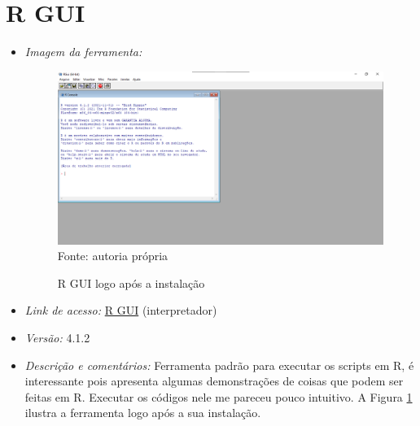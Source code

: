   \section{R GUI}
      \begin{itemize}
      	
      	\item \textit{Imagem da ferramenta:}
      	
      	\begin{figure}[H]  \label{RGUI}
      		\centering
      		\caption{R GUI logo após a instalação}
      		\includegraphics[width=16cm]{PicturesJoaoDias/Ferramentas/RGUI/R_GUI_tela_inicial.png}
      		{\tiny \sf Fonte: autoria própria}
      	\end{figure}
      	
          \item \textit{Link de acesso:} \href{https://cran.rstudio.com/bin/windows/base/}{R GUI} (interpretador)
          \item \textit{Versão:} 4.1.2
          \item \textit{Descrição e comentários:}
            Ferramenta padrão para executar os scripts em R, é interessante pois apresenta algumas demonstrações de coisas que podem ser feitas em R. Executar os códigos nele me pareceu pouco intuitivo. A Figura \ref{RGUI} ilustra a ferramenta logo após a sua instalação.
      \end{itemize}

\newpage
